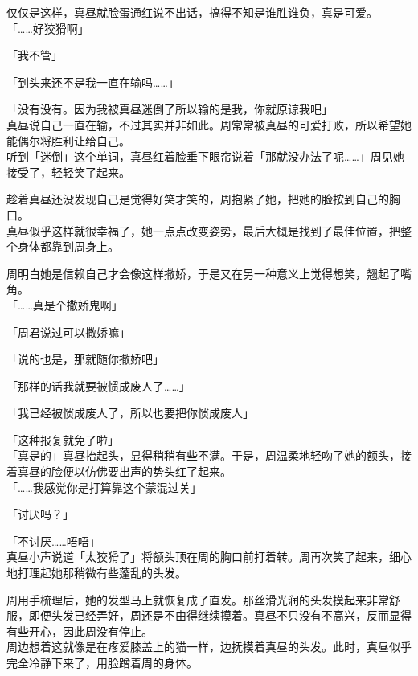 仅仅是这样，真昼就脸蛋通红说不出话，搞得不知是谁胜谁负，真是可爱。\\

「……好狡猾啊」

「我不管」

「到头来还不是我一直在输吗……」

「没有没有。因为我被真昼迷倒了所以输的是我，你就原谅我吧」\\

真昼说自己一直在输，不过其实并非如此。周常常被真昼的可爱打败，所以希望她能偶尔将胜利让给自己。\\

听到「迷倒」这个单词，真昼红着脸垂下眼帘说着「那就没办法了呢……」周见她接受了，轻轻笑了起来。

趁着真昼还没发现自己是觉得好笑才笑的，周抱紧了她，把她的脸按到自己的胸口。\\

真昼似乎这样就很幸福了，她一点点改变姿势，最后大概是找到了最佳位置，把整个身体都靠到周身上。

周明白她是信赖自己才会像这样撒娇，于是又在另一种意义上觉得想笑，翘起了嘴角。\\

「……真是个撒娇鬼啊」

「周君说过可以撒娇嘛」

「说的也是，那就随你撒娇吧」

「那样的话我就要被惯成废人了……」

「我已经被惯成废人了，所以也要把你惯成废人」

「这种报复就免了啦」\\

「真是的」真昼抬起头，显得稍稍有些不满。于是，周温柔地轻吻了她的额头，接着真昼的脸便以仿佛要出声的势头红了起来。\\

「……我感觉你是打算靠这个蒙混过关」

「讨厌吗？」

「不讨厌……唔唔」\\

真昼小声说道「太狡猾了」将额头顶在周的胸口前打着转。周再次笑了起来，细心地打理起她那稍微有些蓬乱的头发。

周用手梳理后，她的发型马上就恢复成了直发。那丝滑光润的头发摸起来非常舒服，即便头发已经弄好，周还是不由得继续摸着。真昼不只没有不高兴，反而显得有些开心，因此周没有停止。\\

周边想着这就像是在疼爱膝盖上的猫一样，边抚摸着真昼的头发。此时，真昼似乎完全冷静下来了，用脸蹭着周的身体。\\

